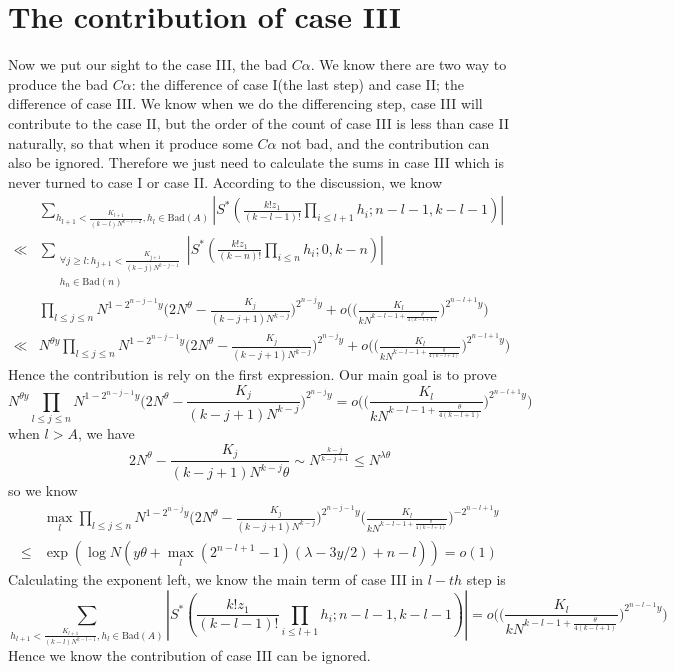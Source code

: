 \documentclass[10pt]{article}
\begin{document}
\section{The contribution of case III}
Now we put our sight to the case III, the bad $C\alpha$. We know there are two way to produce the bad $C\alpha$: the difference of case I(the last step) and case II; the difference of case III. We know when we do the differencing step, case III will contribute to the case II, but the order of the count of case III is less than case II naturally, so that when it produce some $C\alpha$ not bad, and the contribution can also be ignored. Therefore we just need to calculate the sums in case III which is never turned to case I or case II. 
According to the discussion, we know
\begin{align*}
&\sum\limits_{h_{l+1}<\frac{K_{l+1}}{(k-l)N^{k-l-2}},h_l\in\text{Bad}(A)}|S^*(\frac{k!z_1}{(k-l-1)!}\prod\limits_{i\leq l+1}h_i;n-l-1,k-l-1)|\\
\ll&\sum\limits_{\substack{\forall j\geq l:h_{j+1}<\frac{K_{j+1}}{(k-j)N^{k-j-1}}\\h_n\in\text{Bad}(n)}}|S^*(\frac{k!z_1}{(k-n)!}
\prod\limits_{i\leq n}h_i;0,k-n)|\\
&\prod\limits_{l\leq j\leq n}N^{1-2^{n-j-1}y}\bigg(2N^{\theta}-\frac{K_j}{(k-j+1)N^{k-j}}\bigg)^{2^{n-j}y}+o\bigg(\bigg(\frac{K_l}{kN^{k-l-1+\frac{\theta}{4(k-l+1)}}}\bigg)^{2^{n-l+1}y}\bigg)\\
\ll&N^{\theta y}\prod\limits_{l\leq j\leq n}N^{1-2^{n-j-1}y}\bigg(2N^{\theta}-\frac{K_j}{(k-j+1)N^{k-j}}\bigg)^{2^{n-j}y}+o\bigg(\bigg(\frac{K_l}{kN^{k-l-1+\frac{\theta}{4(k-l+1)}}}\bigg)^{2^{n-l+1}y}\bigg)
\end{align*}
Hence the contribution is rely on the first expression. Our main goal is to prove
\[
N^{\theta y}\prod\limits_{l\leq j\leq n}N^{1-2^{n-j-1}y}\bigg(2N^{\theta}-\frac{K_j}{(k-j+1)N^{k-j}}\bigg)^{2^{n-j}y}=o\bigg(\bigg(\frac{K_l}{kN^{k-l-1+\frac{\theta}{4(k-l+1)}}}\bigg)^{2^{n-l+1}y}\bigg)
\]
when $l>A$, we have
\[
2N^{\theta}-\frac{K_j}{(k-j+1)N^{k-j}\theta}\sim N^\frac{k-j}{k-j+1}\leq N^{\lambda\theta}
\]
so we know
\begin{align*}
&\max\limits_{l}\prod\limits_{l\leq j\leq n}N^{1-2^{n-j}y}\bigg(2N^{\theta}-\frac{K_j}{(k-j+1)N^{k-j}}\bigg)^{2^{n-j-1}y}\bigg(\frac{K_l}{kN^{k-l-1+\frac{\theta}{4(k-l+1)}}}\bigg)^{-2^{n-l+1}y}\\
\leq&\exp(\log N(y\theta+\max\limits_l(2^{n-l+1}-1)(\lambda-3y/2)+n-l))=o(1)
\end{align*}
Calculating the exponent left, we know the main term of case III in $l-th$ step is
\[
\sum\limits_{h_{l+1}<\frac{K_{l+1}}{(k-l)N^{k-l-1}},h_l\in\text{Bad}(A)}|S^*(\frac{k!z_1}{(k-l-1)!}\prod\limits_{i\leq l+1}h_i;n-l-1,k-l-1)|=o\bigg(\bigg(\frac{K_l}{kN^{k-l-1+\frac{\theta}{4(k-l+1)}}}\bigg)^{2^{n-l-1}y}\bigg)
\]
Hence we know the contribution of case III can be ignored.
\end{document}
